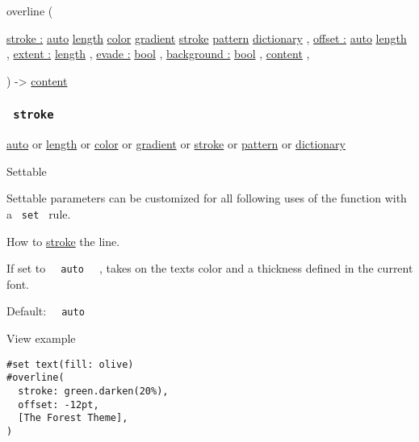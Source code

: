 { overline } (

{ \hyperref[parameters-stroke]{stroke :}
\href{/docs/reference/foundations/auto/}{auto}
\href{/docs/reference/layout/length/}{length}
\href{/docs/reference/visualize/color/}{color}
\href{/docs/reference/visualize/gradient/}{gradient}
\href{/docs/reference/visualize/stroke/}{stroke}
\href{/docs/reference/visualize/pattern/}{pattern}
\href{/docs/reference/foundations/dictionary/}{dictionary} , } {
\hyperref[parameters-offset]{offset :}
\href{/docs/reference/foundations/auto/}{auto}
\href{/docs/reference/layout/length/}{length} , } {
\hyperref[parameters-extent]{extent :}
\href{/docs/reference/layout/length/}{length} , } {
\hyperref[parameters-evade]{evade :}
\href{/docs/reference/foundations/bool/}{bool} , } {
\hyperref[parameters-background]{background :}
\href{/docs/reference/foundations/bool/}{bool} , } {
\href{/docs/reference/foundations/content/}{content} , }

) -\textgreater{} \href{/docs/reference/foundations/content/}{content}

\subsubsection{\texorpdfstring{\texttt{\ stroke\ }}{ stroke }}\label{parameters-stroke}

\href{/docs/reference/foundations/auto/}{auto} {or}
\href{/docs/reference/layout/length/}{length} {or}
\href{/docs/reference/visualize/color/}{color} {or}
\href{/docs/reference/visualize/gradient/}{gradient} {or}
\href{/docs/reference/visualize/stroke/}{stroke} {or}
\href{/docs/reference/visualize/pattern/}{pattern} {or}
\href{/docs/reference/foundations/dictionary/}{dictionary}

{{ Settable }}

\label{parameters-stroke-settable-tooltip}
Settable parameters can be customized for all following uses of the
function with a \texttt{\ set\ } rule.

How to \href{/docs/reference/visualize/stroke/}{stroke} the line.

If set to \texttt{\ }{\texttt{\ auto\ }}\texttt{\ } , takes on the
text\textquotesingle s color and a thickness defined in the current
font.

Default: \texttt{\ }{\texttt{\ auto\ }}\texttt{\ }


View example

\begin{verbatim}
#set text(fill: olive)
#overline(
  stroke: green.darken(20%),
  offset: -12pt,
  [The Forest Theme],
)
\end{verbatim}

